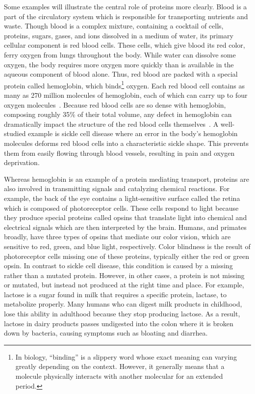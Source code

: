 Some examples will illustrate the central role of proteins more clearly. Blood is a part of the circulatory system which is responsible for transporting nutrients and waste. Though blood is a complex mixture, containing a cocktail of cells, proteins, sugars, gases, and ions dissolved in a medium of water, its primary cellular component is red blood cells. These cells, which give blood its red color, ferry oxygen from lungs throughout the body. While water can dissolve some oxygen, the body requires more oxygen more quickly than is available in the aqueous component of blood alone. Thus, red blood are packed with a special protein called hemoglobin, which binds\footnote{In biology, ``binding'' is a slippery word whose exact meaning can varying greatly depending on the context. However, it generally means that a molecule physically interacts with another molecular for an extended period.} oxygen. Each red blood cell contains as many as 270 million molecules of hemoglobin, each of which can carry up to four oxygen molecules~\cite{Pierig2008}. Because red blood cells are so dense with hemoglobin, composing roughly 35\% of their total volume, any defect in hemoglobin can dramatically impact the structure of the red blood cells themselves~\cite{Kanias2009}. A well-studied example is sickle cell disease where an error in the body's hemoglobin molecules deforms red blood cells into a characteristic sickle shape. This prevents them from easily flowing through blood vessels, resulting in pain and oxygen deprivation.

Whereas hemoglobin is an example of a protein mediating transport, proteins are also involved in transmitting signals and catalyzing chemical reactions. For example, the back of the eye contains a light-sensitive surface called the retina which is composed of photoreceptor cells. These cells respond to light because they produce special proteins called opsins that translate light into chemical and electrical signals which are then interpreted by the brain. Humans, and primates broadly, have three types of opsins that mediate our color vision, which are sensitive to red, green, and blue light, respectively. Color blindness is the result of photoreceptor cells missing one of these proteins, typically either the red or green opsin. In contrast to sickle cell disease, this condition is caused by a missing rather than a mutated protein. However, in other cases, a protein is not missing or mutated, but instead not produced at the right time and place. For example, lactose is a sugar found in milk that requires a specific protein, lactase, to metabolize properly. Many humans who can digest milk products in childhood, lose this ability in adulthood because they stop producing lactose. As a result, lactose in dairy products passes undigested into the colon where it is broken down by bacteria, causing symptoms such as bloating and diarrhea.


